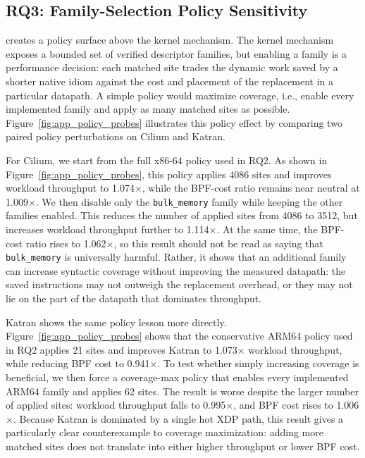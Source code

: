


\subsection{RQ3: Family-Selection Policy Sensitivity}
\label{subsec:policy_sensitivity}


\lang creates a policy surface above the \tool kernel mechanism. The kernel mechanism exposes a bounded set of verified descriptor families, but enabling a family is a performance decision: each matched site trades the dynamic work saved by a shorter native idiom against the cost and placement of the replacement in a particular datapath. A simple policy would maximize coverage, i.e., enable every implemented family and apply as many matched sites as possible. Figure~\ref{fig:app_policy_probes} illustrates this policy effect by comparing two paired policy perturbations on Cilium and Katran.



For Cilium, we start from the full x86-64 \lang policy used in RQ2. As shown in Figure~\ref{fig:app_policy_probes}, this policy applies 4086 sites and improves workload throughput to 1.074$\times$, while the BPF-cost ratio remains near neutral at 1.009$\times$. We then disable only the \texttt{bulk\_memory} family while keeping the other \lang families enabled. This reduces the number of applied sites from 4086 to 3512, but increases workload throughput further to 1.114$\times$. At the same time, the BPF-cost ratio rises to 1.062$\times$, so this result should not be read as saying that \texttt{bulk\_memory} is universally harmful. Rather, it shows that an additional family can increase syntactic coverage without improving the measured datapath: the saved instructions may not outweigh the replacement overhead, or they may not lie on the part of the datapath that dominates throughput.

Katran shows the same policy lesson more directly. Figure~\ref{fig:app_policy_probes} shows that the conservative ARM64 policy used in RQ2 applies 21 sites and improves Katran to 1.073$\times$ workload throughput, while reducing BPF cost to 0.941$\times$. To test whether simply increasing coverage is beneficial, we then force a coverage-max policy that enables every implemented ARM64 family and applies 62 sites. The result is worse despite the larger number of applied sites: workload throughput falls to 0.995$\times$, and BPF cost rises to 1.006$\times$. Because Katran is dominated by a single hot XDP path, this result gives a particularly clear counterexample to coverage maximization: adding more matched sites does not translate into either higher throughput or lower BPF cost.

